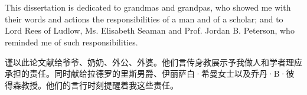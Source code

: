 ﻿\chapter*{}
This dissertation is dedicated to grandmas and grandpas, who showed me with their words and actions the responsibilities of a man and of a scholar; and to Lord Rees of Ludlow, Ms. Elisabeth Seaman and Prof. Jordan B. Peterson, who reminded me of such responsibilities.\\

\begin{CJK*}{UTF8}{gkai}
谨以此论文献给爷爷、奶奶、外公、外婆。他们言传身教展示予我做人和学者理应承担的责任。同时献给拉德罗的里斯男爵、伊丽萨白·希曼女士以及乔丹·B·彼得森教授。他们的言行时刻提醒着我这些责任。
\end{CJK*}